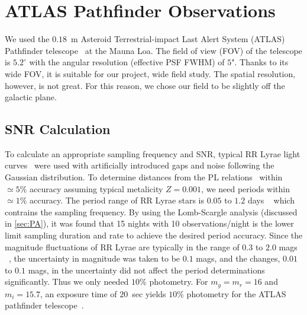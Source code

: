 \documentclass[aps,prb,twocolumn,superscriptaddress]{revtex4-1}
\begin{document}
\section{ATLAS Pathfinder Observations}


We used the $0.18$~m Asteroid Terrestrial-impact Last Alert System (ATLAS) Pathfinder telescope~\citep{fallingstar} at the Mauna Loa. The field of view (FOV) of the telescope is $5.2^{\circ}$ with the angular resolution (effective PSF FWHM) of $5$". Thanks to its wide FOV, it is suitable for our project, wide field study. The spatial resolution, however, is not great. For this reason, we chose our field to be slightly off the galactic plane.



\subsection{SNR Calculation}\label{sec:SNR}

To calculate an appropriate sampling frequency and SNR, typical RR Lyrae light curves~\cite{RRLyrae} were used with artificially introduced gaps and noise following the Gaussian distribution. To determine distances from the PL relations~\citep{PL} within $\simeq5\%$ accuracy assuming typical metalicity $Z=0.001$, we need periods within $\simeq1\%$ accuracy. The period range of RR Lyrae stars is $0.05$ to $1.2$ days ~\cite{Astro} which contrains the sampling frequency. By using the Lomb-Scargle analysis (discussed in \cref{sec:PA}), it was found that 15 nights with 10 observations/night is the lower limit sampling duration and rate to achieve the desired period accuracy. Since the magnitude fluctuations of RR Lyrae are typically in the range of $0.3$ to $2.0$ mags ~\cite{AAVSO}, the uncertainty in magnitude was taken to be $0.1$ mags, and the changes, $0.01$ to $0.1$ mags, in the uncertainty did not affect the period determinations significantly. Thus we only needed $10\%$ photometry. For $m_g = m_r = 16$ and $m_i = 15.7$, an exposure time of $20$~sec yields $10\%$ photometry for the ATLAS pathfinder telescope~\citep{fallingstar}.

\end{document}
